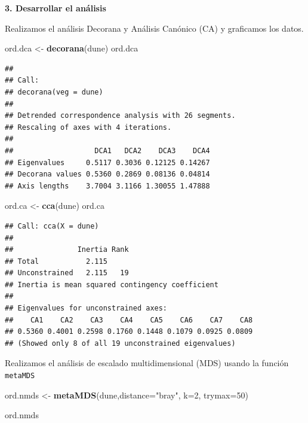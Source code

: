 \documentclass[]{book}
\newenvironment{Shaded}{\begin{snugshade}}{\end{snugshade}}
\newcommand{\KeywordTok}[1]{\textcolor[rgb]{0.13,0.29,0.53}{\textbf{{#1}}}}
\newcommand{\DataTypeTok}[1]{\textcolor[rgb]{0.13,0.29,0.53}{{#1}}}
\newcommand{\DecValTok}[1]{\textcolor[rgb]{0.00,0.00,0.81}{{#1}}}
\newcommand{\StringTok}[1]{\textcolor[rgb]{0.31,0.60,0.02}{{#1}}}
\newcommand{\NormalTok}[1]{{#1}}
\begin{document}
\textbf{3. Desarrollar el análisis}

Realizamos el análisis Decorana y Análisis Canónico (CA) y graficamos
los datos.

\begin{Shaded}
\begin{Highlighting}[]
\NormalTok{ord.dca <-}\StringTok{ }\KeywordTok{decorana}\NormalTok{(dune)}
\NormalTok{ord.dca}
\end{Highlighting}
\end{Shaded}

\begin{verbatim}
## 
## Call:
## decorana(veg = dune) 
## 
## Detrended correspondence analysis with 26 segments.
## Rescaling of axes with 4 iterations.
## 
##                   DCA1   DCA2    DCA3    DCA4
## Eigenvalues     0.5117 0.3036 0.12125 0.14267
## Decorana values 0.5360 0.2869 0.08136 0.04814
## Axis lengths    3.7004 3.1166 1.30055 1.47888
\end{verbatim}

\begin{Shaded}
\begin{Highlighting}[]
\NormalTok{ord.ca <-}\StringTok{ }\KeywordTok{cca}\NormalTok{(dune)}
\NormalTok{ord.ca}
\end{Highlighting}
\end{Shaded}

\begin{verbatim}
## Call: cca(X = dune)
## 
##               Inertia Rank
## Total           2.115     
## Unconstrained   2.115   19
## Inertia is mean squared contingency coefficient 
## 
## Eigenvalues for unconstrained axes:
##    CA1    CA2    CA3    CA4    CA5    CA6    CA7    CA8 
## 0.5360 0.4001 0.2598 0.1760 0.1448 0.1079 0.0925 0.0809 
## (Showed only 8 of all 19 unconstrained eigenvalues)
\end{verbatim}

Realizamos el análisis de escalado multidimensional (MDS) usando la
función \texttt{metaMDS}

\begin{Shaded}
\begin{Highlighting}[]
\NormalTok{ord.nmds <-}\StringTok{ }\KeywordTok{metaMDS}\NormalTok{(dune,}\DataTypeTok{distance=}\StringTok{"bray"}\NormalTok{, }\DataTypeTok{k=}\DecValTok{2}\NormalTok{, }\DataTypeTok{trymax=}\DecValTok{50}\NormalTok{)   }
\end{Highlighting}
\end{Shaded}

\begin{Shaded}
\begin{Highlighting}[]
\NormalTok{ord.nmds }
\end{Highlighting}
\end{Shaded}
\end{document}
